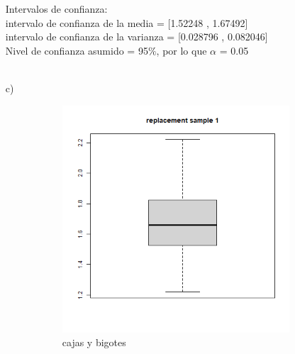 \documentclass[a4paper,12pt]{article}
\begin{document}
\begin{enumerate}
Intervalos de confianza:\\
intervalo de confianza de la media = [1.52248 ,  1.67492]\\
intervalo de confianza de la varianza = [0.028796 ,  0.082046]\\
Nivel de confianza asumido = 95$\%$, por lo que $\alpha$ = 0.05\\\\
\item [c)] 
\begin{figure}[t!]
    \centering
    \begin{subfigure}[b]{0.4\linewidth}             
        \includegraphics[width = \linewidth]{./datos generados (Ejercicio 1)/replacement_sample1_boxplot.png}
        \caption{cajas y bigotes}
    \end{subfigure}
    \begin{subfigure}[b]{0.4\linewidth}               

\end{subfigure}
\end{figure}
\end{enumerate}
\end{document}
